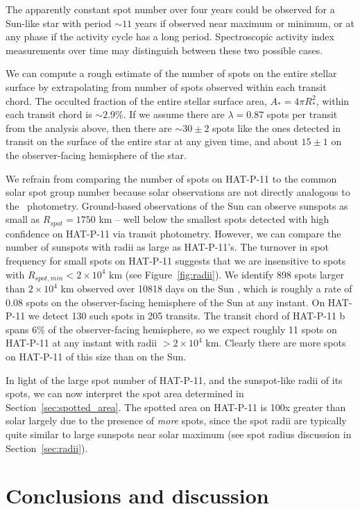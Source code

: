 The apparently constant spot number over four years could be observed for a Sun-like star with period $\sim11$ years if observed near maximum or minimum, or at any phase if the activity cycle has a long period. Spectroscopic activity index measurements over time may distinguish between these two possible cases. 

We can compute a rough estimate of the number of spots on the entire stellar surface by extrapolating from number of spots observed within each transit chord. The occulted fraction of the entire stellar surface area, $A_* = 4\pi R_*^2$, within each transit chord is $\sim 2.9\%$. If we assume there are $\lambda=0.87$ spots per transit from the analysis above, then there are $\sim 30 \pm 2$ spots like the ones detected in transit on the surface of the entire star at any given time, and about $15 \pm 1$ on the observer-facing hemisphere of the star.

We refrain from comparing the number of spots on HAT-P-11 to the common solar spot group number because solar observations are not directly analogous to the \kepler\ photometry. Ground-based observations of the Sun can observe sunspots as small as $R_{spot} = 1750$ km -- well below the smallest spots detected with high confidence on HAT-P-11 via transit photometry. However, we can compare the number of sunspots with radii as large as HAT-P-11's. The turnover in spot frequency for small spots on HAT-P-11 suggests that we are insensitive to spots with $R_{spot,min} < 2 \times 10^4$ km (see Figure~\ref{fig:radii}). We identify 898 spots larger than $2 \times 10^4$ km  observed over 10818 days on the Sun \citep{Howard1984}, which is roughly a rate of $0.08$ spots on the observer-facing hemisphere of the Sun at any instant. On HAT-P-11 we detect 130 such spots in 205 transits. The transit chord of HAT-P-11 b spans 6\% of the observer-facing hemisphere, so we expect roughly 11 spots on HAT-P-11 at any instant with radii $>2 \times 10^4$ km. Clearly there are more spots on HAT-P-11 of this size than on the Sun.

In light of the large spot number of HAT-P-11, and the sunspot-like radii of its spots, we can now interpret the spot area determined in Section~\ref{sec:spotted_area}. The spotted area on HAT-P-11 is 100x greater than solar largely due to the presence of \textit{more} spots, since the spot radii are typically quite similar to large sunspots near solar maximum (see spot radius discussion in Section~\ref{sec:radii}). 

\section{Conclusions and discussion} \label{sec:conclusion}

